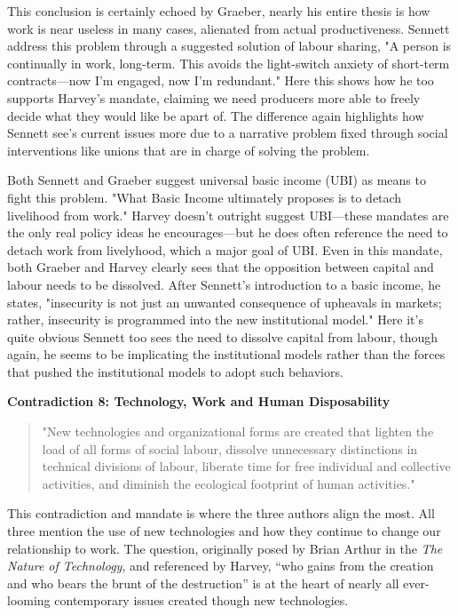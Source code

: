\documentclass[12pt,a4paper]{article}
\begin{document}
This conclusion is certainly echoed by Graeber, nearly his entire thesis is how work is near useless in many cases, alienated from actual productiveness. Sennett address this problem through a suggested solution of labour sharing, "A person is continually in work, long-term. This avoids the light-switch anxiety of short-term contracts---now I’m engaged, now I’m redundant." \cite{new} Here this shows how he too supports Harvey's mandate, claiming we need producers more able to freely decide what they would like be apart of. The difference again highlights how Sennett see's current issues more due to a narrative problem fixed through social interventions like unions that are in charge of solving the problem.

Both Sennett and Graeber suggest universal basic income (UBI) as means to fight this problem. "What Basic Income ultimately proposes is to detach livelihood from work." \cite{bs}  Harvey doesn't outright suggest UBI---these mandates are the only real policy ideas he encourages---but he does often reference the need to detach work from livelyhood, which a major goal of UBI. Even in this mandate, both Graeber and Harvey clearly sees that the opposition between capital and labour needs to be dissolved. After Sennett's introduction to a basic income, he states, "insecurity is not just an unwanted consequence of upheavals in markets; rather, insecurity is programmed into the new institutional model." \cite{new} Here it's quite obvious Sennett too sees the need to dissolve capital from labour, though again, he seems to be implicating the institutional models rather than the forces that pushed the institutional models to adopt such behaviors.

\textbf{Contradiction 8: Technology, Work and Human Disposability}
\begin{quotation} {\color{G-Moon}
    \noindent "New technologies and organizational forms are created that lighten the load of all forms of social labour, dissolve unnecessary distinctions in technical divisions of labour, liberate time for free individual and collective activities, and diminish the ecological footprint of human activities." \cite{con}}
\end{quotation}

This contradiction and mandate is where the three authors align the most. All three mention the use of new technologies and how they continue to change our relationship to work. The question, originally posed by Brian Arthur in the \textit{The Nature of Technology}, and  referenced by Harvey, “who gains from the creation and who bears the brunt of the destruction” \cite{nature} is at the heart of nearly all ever-looming contemporary issues created though new technologies. 
\vspace*{10pt}
\end{document}
